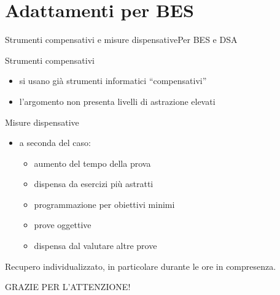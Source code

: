 \documentclass[italian]{beamer}
\begin{document}
\section[Adattamenti per BES]{Adattamenti per BES}
\begin{frame}{Strumenti compensativi e misure dispensative}{Per BES e DSA}
	
	Strumenti compensativi
	\begin{itemize}
		\item si usano gi\`a strumenti informatici ``compensativi''
		\item l'argomento non presenta livelli di astrazione elevati
	\end{itemize}
	
	Misure dispensative
	
	\begin{itemize}
		\item a seconda del caso:
		\begin{itemize}
			\item aumento del tempo della prova
			\item dispensa da esercizi pi\`u astratti
			\item programmazione per obiettivi minimi
			\item prove oggettive
			\item dispensa dal valutare altre prove
		\end{itemize}
	\end{itemize}
	
	Recupero individualizzato, in particolare durante le ore in compresenza.
			
	\note{%
		
	}%
\end{frame}

\begin{frame}[plain]
	
	\vfill
	
	\begin{center}
		{\Large GRAZIE PER L'ATTENZIONE!}
	\end{center}
	
	\vfill
	
\end{frame}
\end{document}
